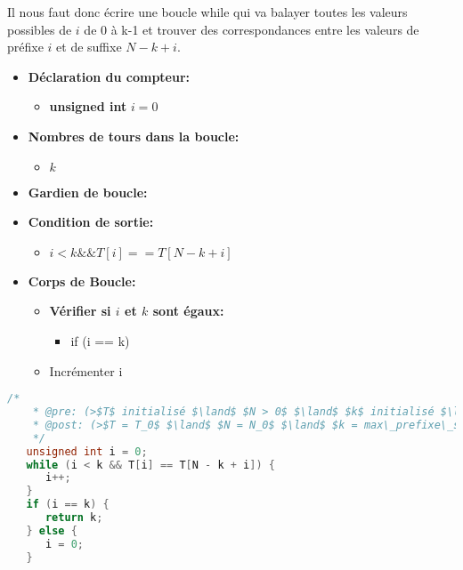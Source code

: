 \vspace{0.4cm}
Il nous faut donc écrire une boucle while qui va balayer toutes les valeurs
possibles de $i$ de 0 à k-1 et trouver des correspondances entre les
valeurs de préfixe $i$ et de suffixe $N-k+i$.
\begin{itemize}
   \item \textbf{Déclaration du compteur:}
      \begin{itemize}
         \item \textbf{unsigned int} $i = 0$
      \end{itemize}
   \item \textbf{Nombres de tours dans la boucle:}
      \begin{itemize}
         \item $k$
      \end{itemize}
   \item \textbf{Gardien de boucle:}
   \item \textbf{Condition de sortie:}
      \begin{itemize}
         \item $i < k $\space$ \&\& $\space$ T[i] == T[N - k +i]$
      \end{itemize}
   \item \textbf{Corps de Boucle:}
   \begin{itemize}
      \item \textbf{Vérifier si $i$ et $k$ sont égaux:}
      \begin{itemize}
      \item if (i == k)
      \end{itemize}
      \item Incrémenter i
   \end{itemize}
\end{itemize}

\vspace{0.4cm}
\begin{lstlisting}[language=C, caption=SP2]
   /*
    * @pre: (>$T$ initialisé $\land$ $N > 0$ $\land$ $k$ initialisé $\land$ $0 \leq i < k$<)
    * @post: (>$T = T_0$ $\land$ $N = N_0$ $\land$ $k = max\_prefixe\_suffixe(*T,k,N)$ $\land$ $k \geq 0$<)
    */
   unsigned int i = 0;
   while (i < k && T[i] == T[N - k + i]) {
      i++;
   }
   if (i == k) {
      return k;
   } else {
      i = 0;
   }
\end{lstlisting}